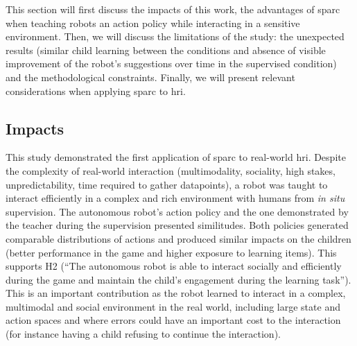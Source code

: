 This section will first discuss the impacts of this work, the advantages of \gls{sparc} when teaching robots an action policy while interacting in a sensitive environment. Then, we will discuss the limitations of the study: the unexpected results (similar child learning between the conditions and absence of visible improvement of the robot's suggestions over time in the supervised condition) and the methodological constraints. Finally, we will present relevant considerations when applying \gls{sparc} to \gls{hri}.

\subsection{Impacts} \label{sec:tuto_impacts}



This study demonstrated the first application of \gls{sparc} to real-world \gls{hri}. Despite the complexity of real-world interaction (multimodality, sociality, high stakes, unpredictability, time required to gather datapoints), a robot was taught to interact efficiently in a complex and rich environment with humans from \textit{in situ} supervision. The autonomous robot's action policy and the one demonstrated by the teacher during the supervision presented similitudes. Both policies generated comparable distributions of actions and produced similar impacts on the children (better performance in the game and higher exposure to learning items). This supports H2 (``The autonomous robot is able to interact socially and efficiently during the game and maintain the child’s engagement during the learning task''). %
This is an important contribution as the robot learned to interact in a complex, multimodal and social environment in the real world, including large state and action spaces and where errors could have an important cost to the interaction (for instance having a child refusing to continue the interaction). %


